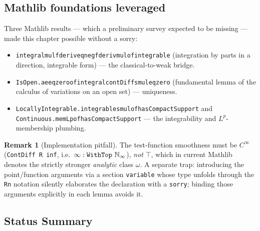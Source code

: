 ﻿\documentclass[12pt, a4paper]{article}
\renewcommand{\_}{\origunderscore\allowbreak}
\theoremstyle{definition}
\newtheorem{remark}{Remark}[section]
\theoremstyle{plain}
\begin{document}
\subsection{Mathlib foundations leveraged}

Three Mathlib results --- which a preliminary survey expected to be missing --- made
this chapter possible without a sorry:
\begin{itemize}
  \item \texttt{integral\_mul\_fderiv\_eq\_neg\_fderiv\_mul\_of\_integrable}
    (integration by parts in a direction, integrable form) --- the
    classical-to-weak bridge.
  \item \texttt{IsOpen.ae\_eq\_zero\_of\_integral\_contDiff\_smul\_eq\_zero}
    (fundamental lemma of the calculus of variations on an open set) --- uniqueness.
  \item \texttt{LocallyIntegrable.integrable\_smul\_*\_of\_hasCompactSupport} and
    \texttt{Continuous.memLp\_of\_hasCompactSupport} --- the integrability and
    $L^p$-membership plumbing.
\end{itemize}

\begin{remark}[Implementation pitfall]
The test-function smoothness must be $C^\infty$ (\texttt{ContDiff R inf}, i.e.\
$\infty : \mathtt{With\-Top}\ \mathbb{N}_\infty$), \emph{not} $\top$, which in
current Mathlib denotes the strictly stronger \emph{analytic} class $\omega$. A
separate trap: introducing the point/function arguments via a section
\texttt{variable} whose type unfolds through the \texttt{Rn} notation silently
elaborates the declaration with a \texttt{sorry}; binding those arguments
explicitly in each lemma avoids it.
\end{remark}

\subsection{Status Summary}
\end{document}
